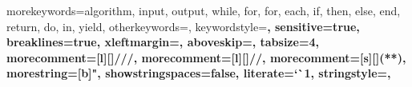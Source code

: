 


%
{
  morekeywords={algorithm, input, output, while, for, for, each, if, then, else, end, return, do, in, yield},
  otherkeywords={},
  keywordstyle=\fontsize{9}{10}\bfseries,
  sensitive=true,
  breaklines=true,
  xleftmargin=\parindent,
  aboveskip=\bigskipamount,
  tabsize=4,
  morecomment=[l][\color{greencomments}]{///},
  morecomment=[l][\color{greencomments}]{//},
  morecomment=[s][\color{greencomments}]{{(*}{*)}},
  morestring=[b]",
  showstringspaces=false,
  literate={`}{\`}1,
  stringstyle=\color{redstrings},
}





\usepackage[acronym, toc, nopostdot, style=super, nonumberlist]{glossaries}


\usepackage[squaren]{SIunits}


%
\usepackage{setspace}

%
\raggedbottom     %


\usepackage[%
   automark,	 %
   nouppercase,	 %
]{scrpage2}

